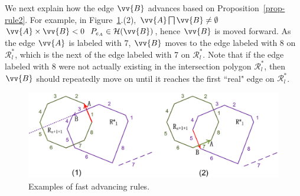 We next explain how the edge $\vv{B}$ advances based on Proposition~\ref{prop-rule2}.
For example, in Figure~\ref{fig:r-poly-rule1}.(2), $\vv{A} \bigsqcap \vv{B} \ne \emptyset$ \And $\vv{A} \times \vv{B} < 0$ \And $P_{e_A} \in \mathcal{H}(\vv{B})$, hence $\vv{B}$ is moved forward. As the edge $\vv{A}$ is labeled with 7,
$\vv{B}$ moves to the edge labeled with 8 on $\mathcal{R}^*_{l}$, which is the next of the edge labeled with 7 on $\mathcal{R}^*_{l}$.
Note that if the edge labeled with 8 were not actually existing in the intersection polygon $\mathcal{R}^*_{l}$, then $\vv{B}$ should repeatedly move on until it reaches the first ``real" edge on $\mathcal{R}^*_{l}$.




\begin{figure}[tb!]
	\centering
	\includegraphics[scale=0.82]{figures/Fig-r-poly-rule1.png}
	\vspace{-1ex}
	\caption{\small Examples of fast advancing rules.}
	\vspace{-1ex}
	\label{fig:r-poly-rule1}
\end{figure}





